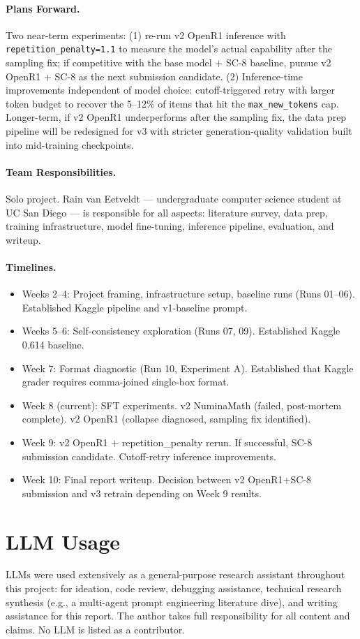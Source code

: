 \documentclass{article}
\begin{document}
\paragraph{Plans Forward.}
Two near-term experiments: (1) re-run v2 OpenR1 inference with \texttt{repetition\_penalty=1.1} to measure the model's actual capability after the sampling fix; if competitive with the base model + SC-8 baseline, pursue v2 OpenR1 + SC-8 as the next submission candidate. (2) Inference-time improvements independent of model choice: cutoff-triggered retry with larger token budget to recover the 5--12\% of items that hit the \texttt{max\_new\_tokens} cap. Longer-term, if v2 OpenR1 underperforms after the sampling fix, the data prep pipeline will be redesigned for v3 with stricter generation-quality validation built into mid-training checkpoints.

\paragraph{Team Responsibilities.}
Solo project. Rain van Eetveldt --- undergraduate computer science student at UC San Diego --- is responsible for all aspects: literature survey, data prep, training infrastructure, model fine-tuning, inference pipeline, evaluation, and writeup.

\paragraph{Timelines.}
\begin{itemize}
    \item Weeks 2--4: Project framing, infrastructure setup, baseline runs (Runs 01--06). Established Kaggle pipeline and v1-baseline prompt.
    \item Weeks 5--6: Self-consistency exploration (Runs 07, 09). Established Kaggle 0.614 baseline.
    \item Week 7: Format diagnostic (Run 10, Experiment A). Established that Kaggle grader requires comma-joined single-box format.
    \item Week 8 (current): SFT experiments. v2 NuminaMath (failed, post-mortem complete). v2 OpenR1 (collapse diagnosed, sampling fix identified).
    \item Week 9: v2 OpenR1 + repetition\_penalty rerun. If successful, SC-8 submission candidate. Cutoff-retry inference improvements.
    \item Week 10: Final report writeup. Decision between v2 OpenR1+SC-8 submission and v3 retrain depending on Week 9 results.
\end{itemize}

\section*{LLM Usage}
LLMs were used extensively as a general-purpose research assistant throughout this project: for ideation, code review, debugging assistance, technical research synthesis (e.g., a multi-agent prompt engineering literature dive), and writing assistance for this report. The author takes full responsibility for all content and claims. No LLM is listed as a contributor.



\end{document}
